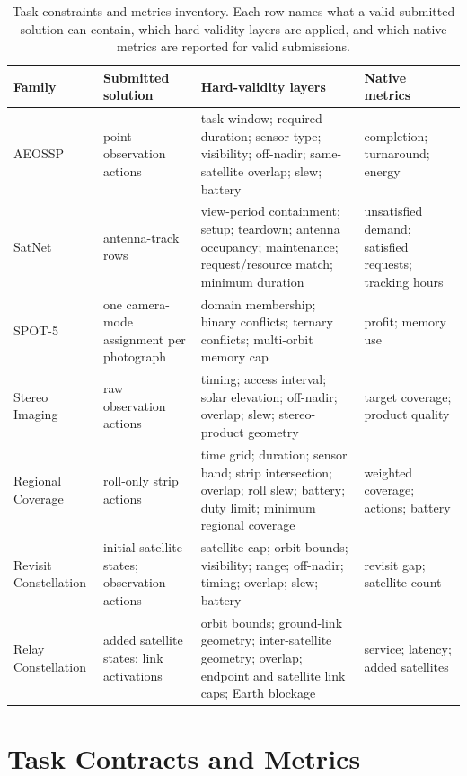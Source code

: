 \documentclass[11pt]{article}
\begin{document}
\begin{table}[!t]
\centering
\scriptsize
\setlength{\tabcolsep}{3pt}
\renewcommand{\arraystretch}{1.15}
\begin{tabular}{>{\raggedright\arraybackslash}p{}>{\raggedright\arraybackslash}p{}>{\raggedright\arraybackslash}p{}>{\raggedright\arraybackslash}p{}}
\hline
\textbf{Family} & \textbf{Submitted solution} & \textbf{Hard-validity layers} & \textbf{Native metrics} \\
\hline
AEOSSP & point-observation actions & task window; required duration; sensor type; visibility; off-nadir; same-satellite overlap; slew; battery & completion; turnaround; energy \\
SatNet & antenna-track rows & view-period containment; setup; teardown; antenna occupancy; maintenance; request/resource match; minimum duration & unsatisfied demand; satisfied requests; tracking hours \\
SPOT-5 & one camera-mode assignment per photograph & domain membership; binary conflicts; ternary conflicts; multi-orbit memory cap & profit; memory use \\
Stereo Imaging & raw observation actions & timing; access interval; solar elevation; off-nadir; overlap; slew; stereo-product geometry & target coverage; product quality \\
Regional Coverage & roll-only strip actions & time grid; duration; sensor band; strip intersection; overlap; roll slew; battery; duty limit; minimum regional coverage & weighted coverage; actions; battery \\
Revisit Constellation & initial satellite states; observation actions & satellite cap; orbit bounds; visibility; range; off-nadir; timing; overlap; slew; battery & revisit gap; satellite count \\
Relay Constellation & added satellite states; link activations & orbit bounds; ground-link geometry; inter-satellite geometry; overlap; endpoint and satellite link caps; Earth blockage & service; latency; added satellites \\
\hline
\end{tabular}
\caption{Task constraints and metrics inventory. Each row names what a valid submitted solution can contain, which hard-validity layers are applied, and which native metrics are reported for valid submissions.}
\label{tab:task-inventory}
\end{table}

\section{Task Contracts and Metrics}
\label{app:task-contracts}
\end{document}
